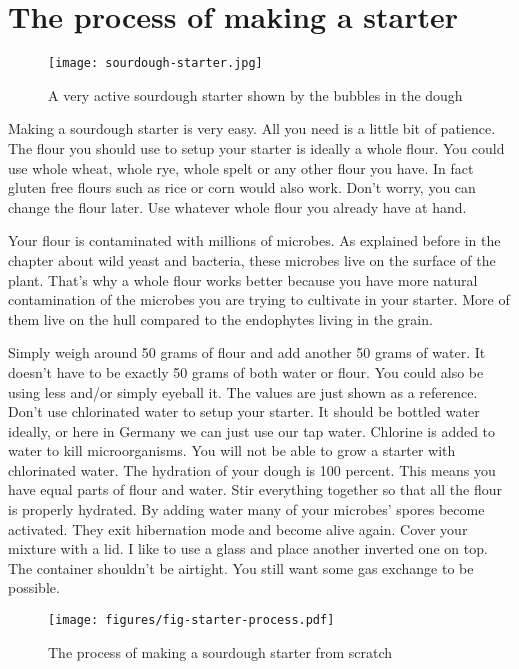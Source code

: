\section{The process of making a starter}

\begin{figure}[!htb]
  \texttt{[image: sourdough-starter.jpg]}
  \caption{A very active sourdough starter shown by the bubbles in the dough}
  \label{fig:sourdough-starter}
\end{figure}

Making a sourdough starter is very easy. All you need
is a little bit of patience. The flour you should
use to setup your starter is ideally a whole flour.
You could use whole wheat, whole rye, whole spelt or
any other flour you have. In fact gluten free flours such
as rice or corn would also work. Don't worry, you can
change the flour later. Use whatever whole flour you
already have at hand.

Your flour is contaminated with millions of microbes. As explained
before in the chapter about wild yeast and bacteria, these
microbes live on the surface of the plant. That's why
a whole flour works better because you have more natural
contamination of the microbes you are trying to cultivate
in your starter. More of them live on the hull compared to the
endophytes living in the grain.

Simply weigh around 50 grams of flour and add another 50
grams of water. It doesn't have to be exactly 50 grams of both
water or flour. You could also be using less and/or simply eyeball
it. The values are just shown as a reference. Don't use chlorinated
water to setup your starter. It should be bottled water ideally,
or here in Germany we can just use our tap water. Chlorine
is added to water to kill microorganisms. You will not
be able to grow a starter with chlorinated water. The hydration
of your dough is 100 percent. This means you have equal parts
of flour and water. Stir everything together so that all the flour
is properly hydrated. By adding water many of your microbes'
spores become activated. They exit hibernation mode and
become alive again. Cover your mixture with a lid. I like to
use a glass and place another inverted one on top. The container shouldn't
be airtight. You still want some gas exchange to be possible.

\begin{figure}[!htb]
  \texttt{[image: figures/fig-starter-process.pdf]}
  \caption{The process of making a sourdough starter from scratch}
  \label{fig:sourdough-starter-process}
\end{figure}

